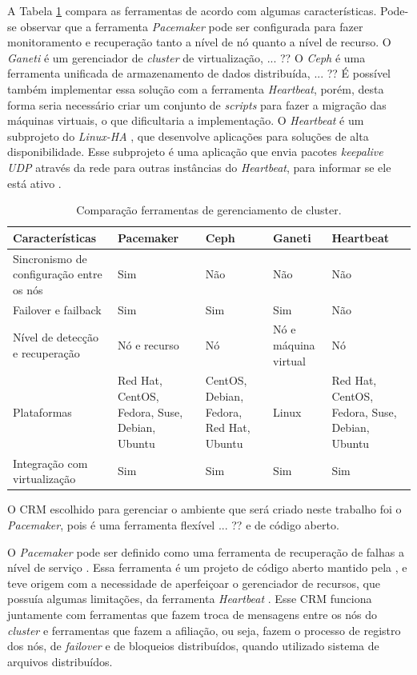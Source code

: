A Tabela \ref{tab:clusterger} compara as ferramentas de acordo com algumas características. Pode-se observar que a ferramenta \textit{Pacemaker}
pode ser configurada para fazer monitoramento e recuperação tanto a nível de nó quanto a nível de recurso.
O \textit{Ganeti} é um gerenciador de \textit{cluster} de virtualização, ... ??
O \textit{Ceph} é uma ferramenta unificada de armazenamento de dados distribuída, ... ??
É possível também implementar essa solução com a ferramenta \textit{Heartbeat}, porém, desta forma seria necessário criar um conjunto de 
\textit{scripts} para fazer a migração das máquinas virtuais, o que dificultaria a implementação.
O \textit{Heartbeat} é um subprojeto do \textit{Linux-HA} \cite{linuxha}, que desenvolve aplicações para soluções de alta disponibilidade.
Esse subprojeto é uma aplicação que envia pacotes \textit{keepalive \ac{UDP}} através da rede para outras instâncias do \textit{Heartbeat}, para
informar se ele está ativo \cite{reis2009}.

\begin{table}[h!]
\caption{Comparação ferramentas de gerenciamento de cluster.}
\label{tab:clusterger}
\begin{center}
\begin{tabular}{|p{3.5cm}|p{2.7cm}|p{2.7cm}|p{2.7cm}|p{2cm}|}\hline
Características & Pacemaker & Ceph & Ganeti & Heartbeat \\\hline
Sincronismo de configuração entre os nós & Sim & Não & Não & Não \\\hline
Failover e failback & Sim & Sim & Sim & Não \\\hline
Nível de detecção e recuperação & Nó e recurso & Nó & Nó e máquina virtual & Nó \\\hline
Plataformas & Red Hat, CentOS, Fedora, Suse, Debian, Ubuntu & CentOS, Debian, Fedora, Red Hat, Ubuntu & Linux & Red Hat, CentOS, Fedora, Suse, Debian, Ubuntu \\\hline
Integração com virtualização & Sim & Sim & Sim & Sim \\\hline
\end{tabular}
\end{center}
\end{table}


O \ac{CRM} escolhido para gerenciar o ambiente que será criado neste trabalho foi o \textit{Pacemaker}, pois é uma ferramenta flexível ... ??
e de código aberto. 

O \textit{Pacemaker} \cite{pacemaker} pode ser definido como uma ferramenta de recuperação de falhas a nível de serviço \cite{perkov2011}. 
Essa ferramenta é um projeto de código aberto mantido pela \cite{clusterlabs}, e teve origem com a necessidade de aperfeiçoar o gerenciador 
de recursos, que possuía algumas limitações, da ferramenta \textit{Heartbeat} \cite{heartbeat}. Esse \ac{CRM} funciona juntamente com ferramentas
que fazem troca de mensagens entre os nós do \textit{cluster} e ferramentas que fazem a afiliação, ou seja, fazem o processo de registro dos
nós, de \textit{failover} e de bloqueios distribuídos, quando utilizado sistema de arquivos distribuídos. 

